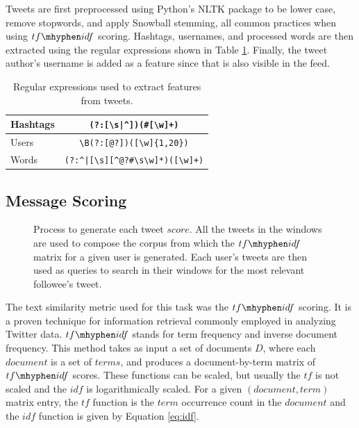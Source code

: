 Tweets are first preprocessed using Python's NLTK package \cite{Bird2009} to be lower case, remove stopwords, and apply Snowball stemming, all common practices when using $tf\mhyphen idf$ scoring.  Hashtags, usernames, and processed words are then extracted using the regular expressions shown in Table \ref{tab:regularExpressions}.  Finally, the tweet author's username is added as a feature since that is also visible in the feed.

\begin{table}[!tb]
	\fontsize{9pt}{10pt}\selectfont
	\centering
		\begin{tabular}{|l|c|}
			\hline
			Hashtags & \verb!(?:[\s|^])(#[\w]+)! \\ \hline
			Users & \verb!\B(?:[@?])([\w]{1,20})! \\ \hline
			Words & \verb!(?:^|[\s][^@?#\s\w]*)([\w]+)! \\ \hline
		\end{tabular}
		\caption{Regular expressions used to extract features from tweets.}
	\label{tab:regularExpressions}
\end{table}

\subsection{Message Scoring}

\begin{figure}[!tb]
\centering
\fontsize{9pt}{10pt}\selectfont

\caption{Process to generate each tweet $score$. All the tweets in the windows are used to compose the corpus from which the $tf\mhyphen idf$ matrix for a given user is generated. Each user's tweets are then used as queries to search in their windows for the most relevant followee's tweet.} 
\label{fig:fig_tfidf_explanation}
\end{figure}

The text similarity metric used for this task was the $tf\mhyphen idf$ scoring. It is a proven technique for information retrieval commonly employed in analyzing Twitter data. 
$tf\mhyphen idf$ stands for term frequency and inverse document frequency. This method takes as input a set of documents $D$, where each $document$ is a set of $terms$, and produces a document-by-term matrix of $tf\mhyphen idf$ scores. These functions can be scaled, but usually the $tf$ is not scaled and the $idf$ is logarithmically scaled. For a given $(document,term)$ matrix entry, the $tf$ function is the $term$ occurrence count in the $document$ and the $idf$ function is given by Equation \ref{eq:idf}.

